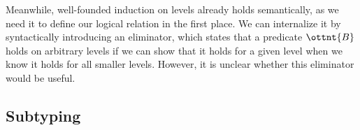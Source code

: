 \documentclass[a4paper,UKenglish,cleveref,autoref,thm-restate]{lipics-v2021}
\newcommand{\citep}[1]{\cite{#1}}
\begin{document}
Meanwhile, well-founded induction on levels already holds semantically,
as we need it to define our logical relation in the first place.
We can internalize it by syntactically introducing an eliminator,
which states that a predicate $\ottnt{B}$ holds on arbitrary levels
if we can show that it holds for a given level
when we know it holds for all smaller levels.
However, it is unclear whether this eliminator would be useful.
%

\iffalse
For universes, the simplest form of an eliminator is a typecase operator,
matching on a type as a function type, the empty type, a universe, or a level type.
Such an operator is justified by \nameref{lem:canon:univ}.
However, it is known to introduce inconsistencies in the presence of parametrized inductive types.
In Idris~\citep{idris}, which has both typecase and inductives,
matching on an inductive with a parameter of type $\kw{Type} \to \kw{Type}$
yields a nonterminating expression%
\footnote{See issue \href{https://github.com/idris-lang/Idris2/issues/1116}{\#1116}},
and matching on an inductive with a parameter of type $\kw{Type} \to \kw{Bool}$
yields a proof of $\kw{Void}$%
\footnote{See issue \href{https://github.com/idris-lang/Idris2/issues/1326}{\#1326}}.
\fi

\subsection{Subtyping} \label{sec:subtyping}
\end{document}
